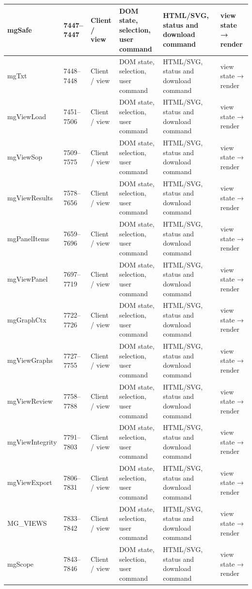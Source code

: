\begin{landscape}
\begin{longtable}{@{}p{3.2cm}p{1.45cm}p{2.7cm}p{4.0cm}p{4.0cm}p{3.0cm}@{}}
mgSafe & 7447--7447 & Client / view & DOM state, selection, user command & HTML/SVG, status and download command & view state → render \\\hline
mgTxt & 7448--7448 & Client / view & DOM state, selection, user command & HTML/SVG, status and download command & view state → render \\\hline
mgViewLoad & 7451--7506 & Client / view & DOM state, selection, user command & HTML/SVG, status and download command & view state → render \\\hline
mgViewSop & 7509--7575 & Client / view & DOM state, selection, user command & HTML/SVG, status and download command & view state → render \\\hline
mgViewResults & 7578--7656 & Client / view & DOM state, selection, user command & HTML/SVG, status and download command & view state → render \\\hline
mgPanelItems & 7659--7696 & Client / view & DOM state, selection, user command & HTML/SVG, status and download command & view state → render \\\hline
mgViewPanel & 7697--7719 & Client / view & DOM state, selection, user command & HTML/SVG, status and download command & view state → render \\\hline
mgGraphCtx & 7722--7726 & Client / view & DOM state, selection, user command & HTML/SVG, status and download command & view state → render \\\hline
mgViewGraphs & 7727--7755 & Client / view & DOM state, selection, user command & HTML/SVG, status and download command & view state → render \\\hline
mgViewReview & 7758--7788 & Client / view & DOM state, selection, user command & HTML/SVG, status and download command & view state → render \\\hline
mgViewIntegrity & 7791--7803 & Client / view & DOM state, selection, user command & HTML/SVG, status and download command & view state → render \\\hline
mgViewExport & 7806--7831 & Client / view & DOM state, selection, user command & HTML/SVG, status and download command & view state → render \\\hline
MG\_VIEWS & 7833--7842 & Client / view & DOM state, selection, user command & HTML/SVG, status and download command & view state → render \\\hline
mgScope & 7843--7846 & Client / view & DOM state, selection, user command & HTML/SVG, status and download command & view state → render \\\hline

\end{longtable}
\end{landscape}
